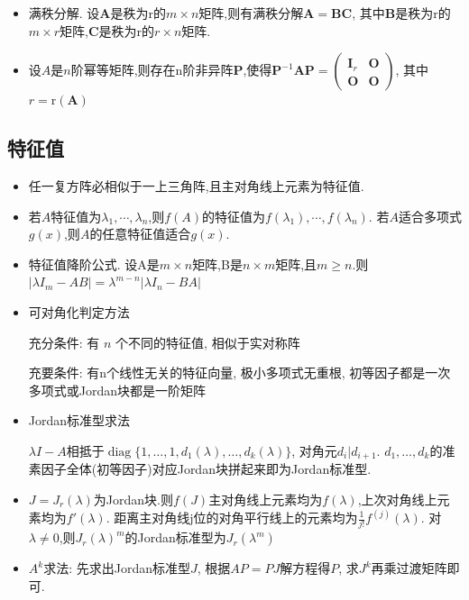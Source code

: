 \documentclass[UTF8]{ctexart}
\begin{document}
\begin{itemize}
\item 满秩分解.
设$\boldsymbol{A}$是秩为r的$m\times n$矩阵,则有满秩分解$\boldsymbol{A}=\boldsymbol{B}\boldsymbol{C}$,
其中$\boldsymbol{B}$是秩为r的$m\times r$矩阵,$\boldsymbol{C}$是秩为r的$r\times n$矩阵.

\item 设$A$是$n$阶幂等矩阵,则存在n阶非异阵$\boldsymbol{P}$,使得$\boldsymbol{P}^{-1} \boldsymbol{A P}=\left(\begin{array}{ll}\boldsymbol{I}_{r} & \boldsymbol{O} \\ \boldsymbol{O} & \boldsymbol{O}\end{array}\right)$,
其中$r=\mathrm{r}(\boldsymbol{A})$ 

\end{itemize}


\subsection{特征值}

\begin{itemize}

\item 任一复方阵必相似于一上三角阵,且主对角线上元素为特征值.

\item 若$A$特征值为$\lambda_1,\cdots,\lambda_n$,则$f(A)$的特征值为$f(\lambda_1),\cdots,f(\lambda_n)$.
若$A$适合多项式$g(x)$,则$A$的任意特征值适合$g(x)$.

\item 特征值降阶公式.
设A是$m \times n$矩阵,B是$n \times m$矩阵,且$m \geq n$.则
$\left|\lambda I_{m}-A B\right|=\lambda^{m-n}\left|\lambda I_{n}-B A\right|$

\item 可对角化判定方法\par 
充分条件: 有 $n$ 个不同的特征值, 相似于实对称阵\par 
充要条件: 有n个线性无关的特征向量, 极小多项式无重根, 初等因子都是一次多项式或Jordan块都是一阶矩阵

\item Jordan标准型求法\par 
$\lambda I-A$相抵于$\operatorname{diag}\{1,\dots,1,d_1(\lambda),\dots,d_k(\lambda)\}$, 对角元$d_i | d_{i+1}$.
$d_1,\dots,d_k$的准素因子全体(初等因子)对应Jordan块拼起来即为Jordan标准型.

\item $J=J_r(\lambda )$为Jordan块.则$f(J)$主对角线上元素均为$f(\lambda )$,上次对角线上元素均为$f'(\lambda)$.
距离主对角线j位的对角平行线上的元素均为$\frac{1}{j!}f^{(j)}(\lambda)$.
对$\lambda\neq 0$,则$J_r(\lambda)^m$的Jordan标准型为$J_r(\lambda^m)$

\item $A^k$求法: 先求出Jordan标准型$J$, 根据$AP=PJ$解方程得$P$, 求$J^k$再乘过渡矩阵即可.

\end{itemize}
\end{document}
